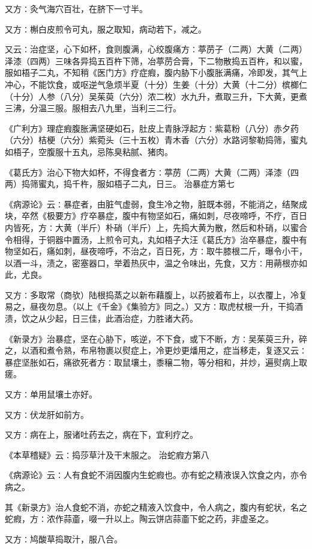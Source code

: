 \documentclass[a4paper,12pt,UTF8,twoside]{ctexbook}
\begin{document}
又方∶灸气海穴百壮，在脐下一寸半。

又方∶槲白皮煎令可丸，服之取知，病动若下，减之。

又云∶治症坚，心下如杯，食则腹满，心绞腹痛方∶葶苈子（二两）大黄（二两）泽漆（四两）三味各异捣五百杵下筛，冶葶苈合膏，下二物散捣五百杵，和以蜜，服如梧子二丸，不知稍《医门方》疗症瘕，腹内胁下小腹胀满痛，冷即发，其气上冲心，不能饮食，或呕逆气急烦半夏（十分）生姜（十分）大黄（十二分）槟榔仁（十分）人参（八分）吴茱萸（六分）浓二枚）水九升，煮取三升，下大黄，更煮三沸，分温三服。服相去八九里，当利三二行。

《广利方》理症瘕腹胀满坚硬如石，肚皮上青脉浮起方∶紫葛粉（八分）赤夕药（六分）桔梗（六分）紫菀头（三十五枚）青木香（六分）水路诃黎勒捣筛，蜜丸如梧子，空腹服十五丸，忌陈臭粘腻、猪肉。

《葛氏方》治心下物大如杯，不得食者方∶葶苈（二两）大黄（二两）泽漆（四两）捣筛蜜丸，捣千杵，服如梧子二丸，日三。
治暴症方第七

《病源论》云∶暴症者，由脏气虚弱，食生冷之物，脏既本弱，不能消之，结聚成块，卒然《极要方》疗卒暴症，腹中有物坚如石，痛如刺，尽夜啼呼，不疗，百日内皆死，方∶大黄（半斤）朴硝（半斤）上，先捣大黄为散，然后和朴硝，以蜜合令相得，于铜器中置汤，上煎令可丸，丸如梧子大汪《葛氏方》治卒暴症，腹中有物坚如石，痛如刺，昼夜啼呼，不治之，百日死，方∶取牛膝根二斤，曝令小干，以酒一斗，渍之，密塞器口，举着热灰中，温之令味出，先食，又方∶用蒴根亦如此，尤良。

又方∶多取常（商欤）陆根捣蒸之以新布藉腹上，以药披着布上，以衣覆上，冷复易之，昼夜勿息。（以上《千金》《集验方》同之。）又方∶取虎杖根一升，干捣酒渍，饮之从少起，日三佳，此酒治症，力胜诸大药。

《新录方》治暴症，坚在心胁下，咳逆，不下食，或下不断，方∶吴茱萸三升，碎之，以酒和煮令熟，布帛物裹以熨症上，冷更炒更燔用之，症当移走，复逐又云∶暴症坚胀如石，痛欲死者方∶取鼠壤土，黍穣二物，等分相和，并炒，遍熨病上取瘥。

又方∶单用鼠壤土亦好。

又方∶伏龙肝如前方。

又方∶病在上，服诸吐药去之，病在下，宜利疗之。

《本草稽疑》云∶捣莎草汁及干末服之。
治蛇瘕方第八

《病源论》云∶人有食蛇不消因腹内生蛇瘕也。亦有蛇之精液误入饮食之内，亦令病之。

其《新录方》治人食蛇不消，亦蛇之精液入饮食中，令人病之，腹内有蛇状，名之蛇瘕，方∶浓作蒜齑，啜一升以上。陶云饼店蒜齑下蛇之药，非虚圣之。

又方∶鸠酸草捣取汁，服八合。
\end{document}
